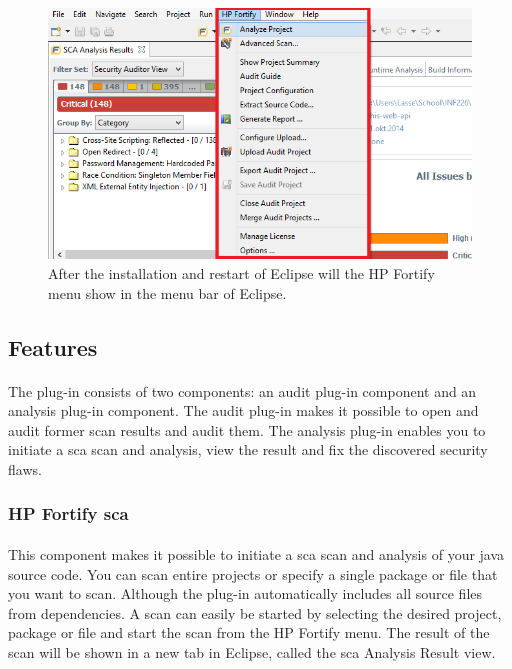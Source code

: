 \documentclass[11pt,english,a4paper]{report}
\begin{document}
\begin{figure}[h]
    \centering
    \includegraphics[scale=0.45]{images/fortifymenu-sc.png}
    \caption{After the installation and restart of Eclipse will the HP Fortify menu show in the menu bar of Eclipse.}
    \label{fig:fortifymenuscreenshot}
\end{figure}

\subsection{Features}
\paragraph{}
The plug-in consists of two components: an audit plug-in component and an analysis plug-in component. 
The audit plug-in makes it possible to open and audit former scan results and audit them. 
The analysis plug-in enables you to initiate a \gls{sca} scan and analysis, view the result and fix the discovered security flaws. \cite{installation-usage-guide}

\subsubsection{HP Fortify \gls{sca}}
\paragraph{}
This component makes it possible to initiate a \gls{sca} scan and analysis of your \gls{java} source code.
You can scan entire projects or specify a single package or file that you want to scan. 
Although the plug-in automatically includes all source files from dependencies. 
A scan can easily be started by selecting the desired project, package or file and start the scan from the HP Fortify menu.
The result of the scan will be shown in a new tab in Eclipse, called the \gls{sca} Analysis Result view. \cite{installation-usage-guide}
\end{document}
